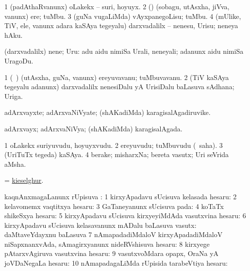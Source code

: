 \bentry
{}
\gl{\sakirx}
\bmng
\bnum
\num{1} (padAthaRvanunx) oLakekx -- suri, hoyuyx. 
\num{2} (\rUpa) (sobagu, utAsxha, jiVva, \mo vanunx) ere; tuMbu. 
\num{3} (guNa \mo vugaLiMda) vAyxpanegoLisu; tuMbu. 
\num{4} (mUlike, TiV, ele, \mo vanunx adara kaSAya tegeyalu) darxvadalilx -- nenesu, Urisu; neneya hAku. 
\enum
\emng

\noindent
\gl{\akirx}
\bmng
(darxvadalilx) nene; Uru:  adu aidu nimiSa Urali, neneyali; adanunx aidu nimiSa UragoDu. 
\emng
\eentry

\bentry
{}
\gl{\nA}
\bmng
\bnum
\num{1} (\kanmu\ \rUpa) (utAsxha, guNa, \mo vanunx) ereyuvavanu; tuMbuvavanu. 
\num{2} (TiV kaSAya tegeyalu adanunx) darxvadalilx nenesiDalu yA UrisiDalu baLasuva sAdhana; Uriga. 
\enum
\emng
\eentry

\bentry
{}
\gl{\nA}
\bmng
adArxvayxte; adArxvaNiVyate; (shAKadiMda) karagisalAgadiruvike. 
\emng
\eentry

\bentry
{}
\gl{\gu}
\bmng
adArxvayx; adArxvaNiVya; (shAKadiMda) karagisalAgada. 
\emng
\eentry

\bentry
{}
\gl{\nA}
\bmng
\bnum
\num{1} oLakekx suriyuvudu, hoyuyxvudu. 
\num{2} ereyuvudu; tuMbuvudu (\rUpa\ saha). 
\num{3} (UriTuTx tegeda) kaSAya. 
\num{4} berake; misharxNa; bereta vasutx; Uri seVrida aMsha. 
\enum
\emng
\eentry

\bentry
{}
\gl{\nA}
\bmng
= \hyperref{kandict_k.pdf}{K}{kieselghur}{kieselghur}. 
\emng
\eentry

\bentry
{}
\gl{\uparx}
\bmng
kaqnAnxmagaLanunx rUpisuva \uparx: 
\bnum
\num{1} kirxyApadavu sUcisuva kelasada hesaru:  
\num{2} kelavomemx vaqtitxya hesaru:  
\num{3} GaTaneyanunx sUcisuva pada:  
\num{4} koTaTx shikeSxya hesaru:  
\num{5} kirxyApadavu sUcisuva kirxyeyiMdAda vasutxvina hesaru:  
\num{6} kirxyApadavu sUcisuva kelasavanunx mADalu baLasuva vasutx:  daMtaveYdayxnu baLasuva  
\num{7} nAmapadadiMdaloV kirxyApadadiMdaloV niSapxnanxvAda, sAmagirxyanunx nideRVshisuva hesaru:  
\num{8} kirxyege pAtarxvAgiruva vasutxvina hesaru:  
\num{9} vasutxvoMdara opapx, OraNa yA joVDaNegaLa hesaru:  
\num{10} nAmapadagaLiMda rUpisida tarabeVtiya hesaru:  
\enum
\emng
\eentry

